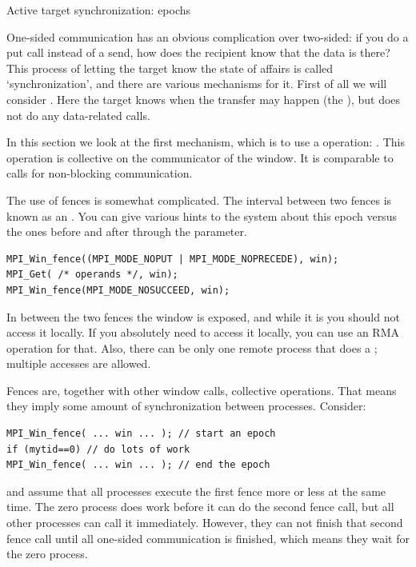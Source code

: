 
 {Active target synchronization: epochs}
\label{sec:fence}

One-sided communication has an obvious complication over two-sided: if
you do a put call instead of a send, how does the recipient know that
the data is there? This process of letting the target know the state
of affairs is called `synchronization', and there are various
mechanisms for it. First of all we will consider . Here the target knows when the transfer
may happen (the ), but does not do
any data-related calls.

In this section we look at the first mechanism,
which is to use a  operation: .
This operation is collective on the communicator of the window.
It is comparable to  calls for non-blocking communication.

The use of fences is somewhat complicated. The interval between two fences
is known as an .
You can give various hints to the system about this epoch versus the ones
before and after through the  parameter.
\begin{lstlisting}
MPI_Win_fence((MPI_MODE_NOPUT | MPI_MODE_NOPRECEDE), win);
MPI_Get( /* operands */, win);
MPI_Win_fence(MPI_MODE_NOSUCCEED, win);
\end{lstlisting}
In between the two fences the window is exposed, and while it is you
should not access it locally. If you absolutely need to access it
locally, you can use an \ac{RMA} operation for that. Also, there can be only one
remote process that does a ; multiple  accesses are allowed.

Fences are, together with other window calls, collective operations. That means they 
imply some amount of synchronization between processes. Consider:
\begin{lstlisting}
MPI_Win_fence( ... win ... ); // start an epoch
if (mytid==0) // do lots of work
MPI_Win_fence( ... win ... ); // end the epoch
\end{lstlisting}
and assume that all processes execute the first fence more or less at the same time.
The zero process does work before it can do the second fence call, but all other
processes can call it immediately. However, they can not finish that second fence call
until all one-sided communication is finished, which means they wait for the zero process.

